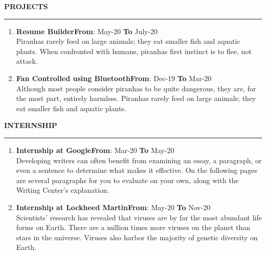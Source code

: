 \documentclass{article}
\begin{document}
{{\begin{itemize}
\end{itemize} 
}
 
\vspace{10pt}

{\large{\textbf{\uppercase{projects}}}}
\vspace{3pt}
\hrule
\vspace{10pt}
\begin{enumerate}
	\item {\textbf{Resume Builder}}\hfill {\textbf{From}}: May-20 {\textbf{To}} July-20\\
	Piranhas rarely feed on large animals; they eat smaller fish and aquatic plants. When confronted with humans, piranhas first instinct is to flee, not attack. 
	\item {\textbf{Fan Controlled using Bluetooth}}\hfill {\textbf{From}}: Dec-19 {\textbf{To}} Mar-20\\
	Although most people consider piranhas to be quite dangerous, they are, for the most part, entirely harmless. Piranhas rarely feed on large animals; they eat smaller fish and aquatic plants.
\end{enumerate}
	
\vspace{10pt}
{\large{\textbf{\uppercase{Internship}}}}
\vspace{3pt}
\hrule
\vspace{10pt}
\begin{enumerate}
	\item {\textbf{Internship at Google}}\hfill {\textbf{From}}: Mar-20 {\textbf{To}} May-20\\
	Developing writers can often benefit from examining an essay, a paragraph, or even a sentence to determine what makes it effective. On the following pages are several paragraphs for you to evaluate on your own, along with the Writing Center's explanation.
	\item {\textbf{Internship at Lockheed Martin}}\hfill {\textbf{From}}: May-20 {\textbf{To}} Nov-20\\
	 Scientists' research has revealed that viruses are by far the most abundant life forms on Earth. There are a million times more viruses on the planet than stars in the universe. Viruses also harbor the majority of genetic diversity on Earth.
\end{enumerate}

\vspace{10pt}


}
\end{document}
